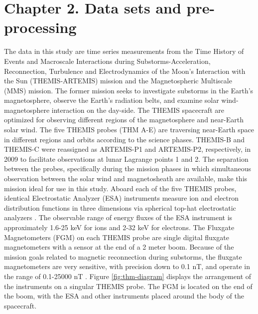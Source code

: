 \chapter{Chapter 2. Data sets and pre-processing}

The data in this study are time series measurements from the Time History of Events and Macroscale Interactions during Substorms-Acceleration, Reconnection, Turbulence and Electrodynamics of the Moon’s Interaction with the Sun (THEMIS-ARTEMIS) mission and the Magnetospheric Multiscale (MMS) mission. The former mission seeks to investigate substorms in the Earth's magnetosphere, observe the Earth's radiation belts, and examine solar wind-magnetosphere interaction on the day-side. The THEMIS spacecraft are optimized for observing different regions of the magnetosphere and near-Earth solar wind. The five THEMIS probes (THM A-E) are traversing near-Earth space in different regions and orbits according to the science phases. THEMIS-B and THEMIS-C were reassigned as ARTEMIS-P1 and ARTEMIS-P2, respectively, in 2009 to facilitate observations at lunar Lagrange points 1 and 2. The separation between the probes, specifically during the mission phases in which simultaneous observation between the solar wind and magnetosheath are available, make this mission ideal for use in this study. Aboard each of the five THEMIS probes, identical Electrostatic Analyzer (ESA) instruments measure ion and electron distribution functions in three dimensions via spherical top-hat electrostatic analyzers \citep{McFadden:2008}. The observable range of energy fluxes of the ESA instrument is approximately 1.6-25 keV for ions and 2-32 keV for electrons. The Fluxgate Magnetometers (FGM) on each THEMIS probe \citep{Auster:2008} are single digital fluxgate magnetometers with a sensor at the end of a 2 meter boom. Because of the mission goals related to magnetic reconnection during substorms, the fluxgate magnetometers are very sensitive, with precision down to 0.1 nT, and operate in the range of 0.1-25000 nT \citep{Auster:2008}. Figure \ref{fig:thm-diagram} displays the arrangement of the instruments on a singular THEMIS probe. The FGM is located on the end of the boom, with the ESA and other instruments placed around the body of the spacecraft.

